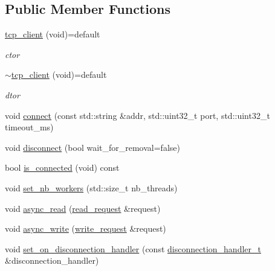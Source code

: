 \subsection*{Public Member Functions}
\begin{DoxyCompactItemize}
\item 
\mbox{\label{classcpp__redis_1_1network_1_1tcp__client_a8cbad07ca636e9d60dafc0e5cac8106d}} 
\mbox{\hyperlink{classcpp__redis_1_1network_1_1tcp__client_a8cbad07ca636e9d60dafc0e5cac8106d}{tcp\+\_\+client}} (void)=default
\begin{DoxyCompactList}\small\item\em ctor \end{DoxyCompactList}\item 
\mbox{\label{classcpp__redis_1_1network_1_1tcp__client_af859036bbc7e5ec9149c1410a1a66f09}} 
\mbox{\hyperlink{classcpp__redis_1_1network_1_1tcp__client_af859036bbc7e5ec9149c1410a1a66f09}{$\sim$tcp\+\_\+client}} (void)=default
\begin{DoxyCompactList}\small\item\em dtor \end{DoxyCompactList}\item 
void \mbox{\hyperlink{classcpp__redis_1_1network_1_1tcp__client_a5808c0569980d83479f755ac55a12dfb}{connect}} (const std\+::string \&addr, std\+::uint32\+\_\+t port, std\+::uint32\+\_\+t timeout\+\_\+ms)
\item 
void \mbox{\hyperlink{classcpp__redis_1_1network_1_1tcp__client_a88f49c4e32d59855a62296fb74136a44}{disconnect}} (bool wait\+\_\+for\+\_\+removal=false)
\item 
bool \mbox{\hyperlink{classcpp__redis_1_1network_1_1tcp__client_a0a636ca6bd59425bf22416a1c7694f65}{is\+\_\+connected}} (void) const
\item 
void \mbox{\hyperlink{classcpp__redis_1_1network_1_1tcp__client_aa56fc49540d67c5c05b3dda3aaff8a0f}{set\+\_\+nb\+\_\+workers}} (std\+::size\+\_\+t nb\+\_\+threads)
\item 
void \mbox{\hyperlink{classcpp__redis_1_1network_1_1tcp__client_a5eed4225fcd01e3108580d863c94c2cc}{async\+\_\+read}} (\mbox{\hyperlink{structcpp__redis_1_1network_1_1tcp__client__iface_1_1read__request}{read\+\_\+request}} \&request)
\item 
void \mbox{\hyperlink{classcpp__redis_1_1network_1_1tcp__client_a6d15785b71776cd85426c9634cb446f0}{async\+\_\+write}} (\mbox{\hyperlink{structcpp__redis_1_1network_1_1tcp__client__iface_1_1write__request}{write\+\_\+request}} \&request)
\item 
void \mbox{\hyperlink{classcpp__redis_1_1network_1_1tcp__client_a24ccdf6dc467aac13cb832a395adb38d}{set\+\_\+on\+\_\+disconnection\+\_\+handler}} (const \mbox{\hyperlink{classcpp__redis_1_1network_1_1tcp__client__iface_a9a7d5942205db8be03da581a848b8ec0}{disconnection\+\_\+handler\+\_\+t}} \&disconnection\+\_\+handler)
\end{DoxyCompactItemize}

